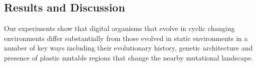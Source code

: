 \subsection{Results and Discussion}

Our experiments show that digital organisms that evolve in cyclic changing environments differ substantially from those evolved in static environments in a number of key ways including their evolutionary history, genetic architecture and presence of plastic mutable regions that change the nearby mutational landscape.